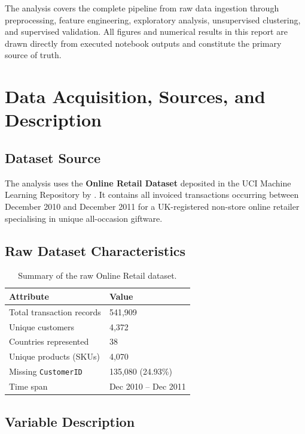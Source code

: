 \documentclass[12pt,a4paper]{article}
\begin{document}
The analysis covers the complete pipeline from raw data ingestion through preprocessing,
feature engineering, exploratory analysis, unsupervised clustering, and supervised
validation.  All figures and numerical results in this report are drawn directly from
executed notebook outputs and constitute the primary source of truth.

\section{Data Acquisition, Sources, and Description}

\subsection{Dataset Source}

The analysis uses the \textbf{Online Retail Dataset} deposited in the UCI Machine
Learning Repository by \textcite{uci_online_retail}.  It contains all invoiced
transactions occurring between December 2010 and December 2011 for a UK-registered
non-store online retailer specialising in unique all-occasion giftware.

\subsection{Raw Dataset Characteristics}

\begin{table}[H]
  \centering
  \caption{Summary of the raw Online Retail dataset.}
  \label{tab:raw_data}
  \begin{tabular}{ll}
    \toprule
    \textbf{Attribute} & \textbf{Value} \\
    \midrule
    Total transaction records & 541,909 \\
    Unique customers          & 4,372 \\
    Countries represented     & 38 \\
    Unique products (SKUs)     & 4,070 \\
    Missing \texttt{CustomerID} & 135,080 (24.93\%) \\
    Time span                 & Dec 2010 -- Dec 2011 \\
    \bottomrule
  \end{tabular}
\end{table}

\subsection{Variable Description}
\end{document}
